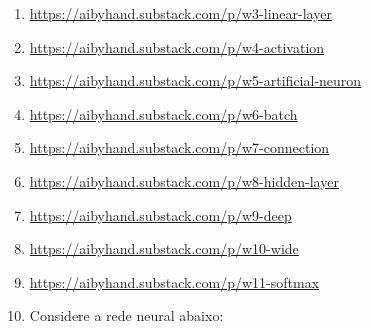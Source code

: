 \documentclass{article}
\begin{document}
\begin{enumerate}

    \item \url{https://aibyhand.substack.com/p/w3-linear-layer}
    \item \url{https://aibyhand.substack.com/p/w4-activation}
    \item \url{https://aibyhand.substack.com/p/w5-artificial-neuron}
    \item \url{https://aibyhand.substack.com/p/w6-batch}
    \item \url{https://aibyhand.substack.com/p/w7-connection}
    \item \url{https://aibyhand.substack.com/p/w8-hidden-layer}
    \item \url{https://aibyhand.substack.com/p/w9-deep}
    \item \url{https://aibyhand.substack.com/p/w10-wide}
    \item \url{https://aibyhand.substack.com/p/w11-softmax}

    \item  Considere a rede neural abaixo:
    
    \begin{figure}[!ht]
        \centering
\end{figure}
\end{enumerate}
\end{document}
